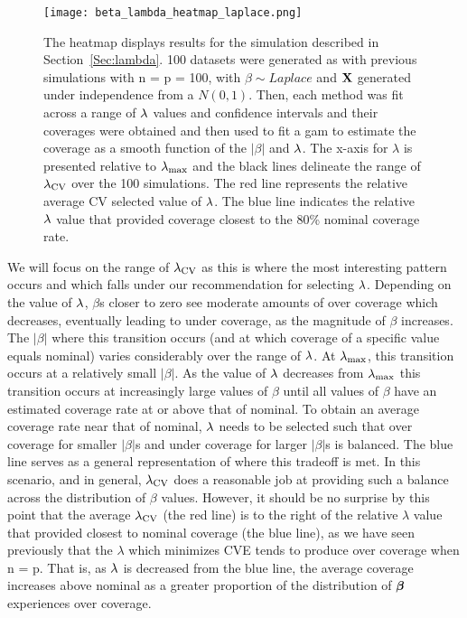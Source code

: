 \begin{figure}[hbtp]
  \begin{center}
  \texttt{[image: beta\_lambda\_heatmap\_laplace.png]}
  \caption{\label{Fig:beta_lambda_heatmap_laplace} The heatmap displays results for the simulation described in Section~\ref{Sec:lambda}. 100 datasets were generated as with previous simulations with n = p = 100, with $\beta \sim Laplace$ and $\mathbf{X}$ generated under independence from a $N(0,1)$. Then, each method was fit across a range of $\lambda$ values and confidence intervals and their coverages were obtained and then used to fit a gam to estimate the coverage as a smooth function of the $|\beta|$ and $\lambda$. The x-axis for $\lambda$ is presented relative to $\lambda_{\max}$ and the black lines delineate the range of $\lambda_{\textrm{CV}}$ over the 100 simulations. The red line represents the relative average CV selected value of $\lambda$. The blue line indicates the relative $\lambda$ value that provided coverage closest to the 80\% nominal coverage rate.}
  \end{center}
\end{figure}


We will focus on the range of $\lambda_{\textrm{CV}}$ as this is where the most interesting pattern occurs and which falls under our recommendation for selecting $\lambda$. Depending on the value of $\lambda$, $\beta$s closer to zero see moderate amounts of over coverage which decreases, eventually leading to under coverage, as the magnitude of $\beta$ increases. The $|\beta|$ where this transition occurs (and at which coverage of a specific value equals nominal) varies considerably over the range of $\lambda$. At $\lambda_{\max}$, this transition occurs at a relatively small $|\beta|$. As the value of $\lambda$ decreases from $\lambda_{\max}$ this transition occurs at increasingly large values of $\beta$ until all values of $\beta$ have an estimated coverage rate at or above that of nominal. To obtain an average coverage rate near that of nominal, $\lambda$ needs to be selected such that over coverage for smaller $|\beta|$s and under coverage for larger $|\beta|$s is balanced. The blue line serves as a general representation of where this tradeoff is met. In this scenario, and in general, $\lambda_{\textrm{CV}}$ does a reasonable job at providing such a balance across the distribution of $\beta$ values. However, it should be no surprise by this point that the average $\lambda_{\textrm{CV}}$ (the red line) is to the right of the relative $\lambda$ value that provided closest to nominal coverage (the blue line), as we have seen previously that the $\lambda$ which minimizes CVE tends to produce over coverage when n = p. That is, as $\lambda$ is decreased from the blue line, the average coverage increases above nominal as a greater proportion of the distribution of $\boldsymbol{\beta}$ experiences over coverage.

